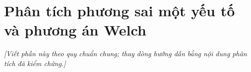 \section{Phân tích phương sai một yếu tố và phương án Welch}
\noindent\textit{[Viết phần này theo quy chuẩn chung; thay dòng hướng dẫn bằng nội dung phân tích đã kiểm chứng.]}

